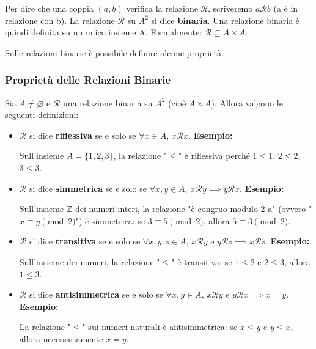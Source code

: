 Per dire che una coppia $(a, b)$ verifica la relazione $\mathcal{R}$, scriveremo $a \mathcal{R} b$ (a è in relazione con b).
La relazione $\mathcal{R}$ su $A^2$ si dice \textbf{binaria}. Una relazione binaria è quindi definita su un unico insieme A. Formalmente: $\mathcal{R} \subseteq A \times A$.

Sulle relazioni binarie è possibile definire alcune proprietà.


\subsubsection{Proprietà delle Relazioni Binarie}
Sia $A \ne \varnothing$ e $\mathcal{R}$ una relazione binaria su $A^2$ (cioè $A \times A$). Allora valgono le seguenti definizioni:

\begin{itemize}
    \item $\mathcal{R}$ si dice \textbf{riflessiva} se e solo se $\forall x \in A$, $x \mathcal{R} x$.
    \textbf{Esempio:}
    \begin{tcolorbox}[colback=gray!10, arc=0mm, boxrule=0.5pt, left=2mm, right=2mm, top=1mm, bottom=1mm]
      Sull'insieme $A = \{1, 2, 3\}$, la relazione "$\leq$" è riflessiva perché $1 \leq 1$, $2 \leq 2$, $3 \leq 3$.
    \end{tcolorbox}

    \item $\mathcal{R}$ si dice \textbf{simmetrica} se e solo se $\forall x, y \in A$, $x \mathcal{R} y \implies y \mathcal{R} x$.
    \textbf{Esempio:}
    \begin{tcolorbox}[colback=gray!10, arc=0mm, boxrule=0.5pt, left=2mm, right=2mm, top=1mm, bottom=1mm]
      Sull'insieme $\mathbb{Z}$ dei numeri interi, la relazione "è congruo modulo 2 a" (ovvero "$x \equiv y \pmod{2}$") è simmetrica: se $3 \equiv 5 \pmod{2}$, allora $5 \equiv 3 \pmod{2}$.
    \end{tcolorbox}

    \item $\mathcal{R}$ si dice \textbf{transitiva} se e solo se $\forall x, y, z \in A$, $x \mathcal{R} y$ e $y \mathcal{R} z \implies x \mathcal{R} z$.
    \textbf{Esempio:}
    \begin{tcolorbox}[colback=gray!10, arc=0mm, boxrule=0.5pt, left=2mm, right=2mm, top=1mm, bottom=1mm]
      Sull'insieme dei numeri, la relazione "$\leq$" è transitiva: se $1 \leq 2$ e $2 \leq 3$, allora $1 \leq 3$.
    \end{tcolorbox}

    \item $\mathcal{R}$ si dice \textbf{antisimmetrica} se e solo se $\forall x, y \in A$, $x \mathcal{R} y$ e $y \mathcal{R} x \implies x = y$.
    \textbf{Esempio:}
    \begin{tcolorbox}[colback=gray!10, arc=0mm, boxrule=0.5pt, left=2mm, right=2mm, top=1mm, bottom=1mm]
      La relazione "$\leq$" sui numeri naturali è antisimmetrica: se $x \leq y$ e $y \leq x$, allora necessariamente $x = y$.
    \end{tcolorbox}
\end{itemize}

